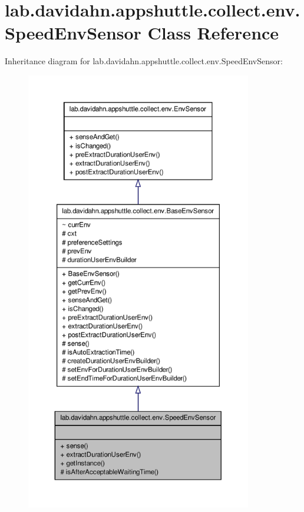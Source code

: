 \hypertarget{classlab_1_1davidahn_1_1appshuttle_1_1collect_1_1env_1_1_speed_env_sensor}{\section{lab.\-davidahn.\-appshuttle.\-collect.\-env.\-Speed\-Env\-Sensor \-Class \-Reference}
\label{classlab_1_1davidahn_1_1appshuttle_1_1collect_1_1env_1_1_speed_env_sensor}
}


\-Inheritance diagram for lab.\-davidahn.\-appshuttle.\-collect.\-env.\-Speed\-Env\-Sensor\-:
\nopagebreak
\begin{figure}[H]
\begin{center}
\leavevmode
\includegraphics[height=550pt]{classlab_1_1davidahn_1_1appshuttle_1_1collect_1_1env_1_1_speed_env_sensor__inherit__graph}
\end{center}
\end{figure}


